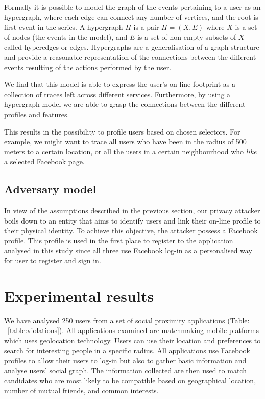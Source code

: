Formally it is possible to model the graph of the events pertaining to a user as an hypergraph, where each edge can connect any number of vertices, and the root is first event in the series.  A hypergraph $H$ is a pair $H = (X,E)$ where $X$ is a set of nodes (the events in the model), and $E$ is a set of non-­empty subsets of $X$ called hyperedges or edges. Hypergraphs are a generalisation of a graph structure and provide a reasonable representation of the connections between the different events resulting of the actions performed by the user.

We find that this model is able to express the user's on-line footprint as a collection of traces left across different services. Furthermore, by using a hypergraph model we are able to grasp the connections between the different profiles and features.

This results in the possibility to profile users based on chosen selectors. For example, we might want to trace all users who have been in the radius of 500 meters to a certain location, or all the users in a certain neighbourhood who \emph{like} a selected Facebook page.

\subsection{Adversary model}

In view of the assumptions described in the previous section, our privacy attacker boils down to an entity that aims to identify users and link their on-line profile to their physical identity. To achieve this objective, the attacker possess a Facebook profile. This profile is used in the first place to register to the application analysed in this study since all three use Facebook log-in as a personalised way for user to register and sign in.

\section{Experimental results}
\label{sec:exp-results}
\noindent
We have analysed 250 users from a set of social proximity applications (Table: ~\ref{table:violations}). All applications examined are matchmaking mobile platforms which uses geolocation technology. Users can use their location and preferences to search for interesting people in a specific radius. All applications use Facebook profiles to allow their users to log-in but also to gather basic information and analyse users' social graph. The information collected are then used to match candidates who are most likely to be compatible based on geographical location, number of mutual friends, and common interests.

